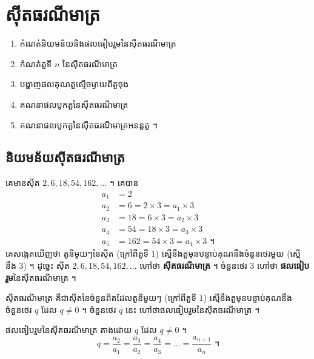 \chapter{ស៊ីតធរណីមាត្រ}

\begin{objBox}[វត្ថុបំណង]
\begin{enumerate}[1]
  \item កំណត់និយមន័យនិងផលធៀបរួមនៃស៊ីតធរណីមាត្រ
  \item កំណត់តួទី $n$ នៃស៊ីតធរណីមាត្រ
  \item បង្ហាញផលគុណតួស្មើចម្ងាយពីតួចុង
  \item គណនាផលបូកតួនៃស៊ីតធរណីមាត្រ
  \item គណនាផលបូកតួនៃស៊ីតធរណីមាត្រអនន្តតួ ។
\end{enumerate}
\end{objBox}

\section{និយមន័យស៊ីតធរណីមាត្រ}

\begin{example}[ឧទាហរណ៍]
គេមានស៊ីត $2, 6, 18, 54, 162, \ldots$ ។ គេបាន
\[
\begin{aligned}
a_1 &= 2\\
a_2 &= 6 = 2 \times 3 = a_1 \times 3\\
a_3 &= 18 = 6 \times 3 = a_2 \times 3\\
a_4 &= 54 = 18 \times 3 = a_3 \times 3\\
a_5 &= 162 = 54 \times 3 = a_4 \times 3 \text{ ។}
\end{aligned}
\]
គេសង្កេតឃើញថា តួនីមួយៗនៃស៊ីត (ក្រៅពីតួទី $1$) ស្មើនឹងតួមុនបន្ទាប់គុណនឹងចំនួនថេរមួយ (ស្មើនឹង $3$) ។ ដូច្នេះ ស៊ីត $2, 6, 18, 54, 162, \ldots$ ហៅថា \textbf{ស៊ីតធរណីមាត្រ} ។ ចំនួនថេរ $3$ ហៅថា \textbf{ផលធៀបរួម}នៃស៊ីតធរណីមាត្រ ។
\end{example}

\begin{definition}
ស៊ីតធរណីមាត្រ គឺជាស៊ីតនៃចំនួនពិតដែលតួនីមួយៗ (ក្រៅពីតួទី $1$) ស្មើនឹងតួមុនបន្ទាប់គុណនឹងចំនួនថេរ $q$ ដែល $q \ne 0$ ។ ចំនួនថេរ $q$ នេះ ហៅថាផលធៀបរួមនៃស៊ីតធរណីមាត្រ ។
\end{definition}

\begin{formulaBox}[ជាទូទៅ]
ផលធៀបរួមនៃស៊ីតធរណីមាត្រ តាងដោយ $q$ ដែល $q \ne 0$ ។
\[
q = \frac{a_2}{a_1} = \frac{a_3}{a_2} = \frac{a_4}{a_3} = \ldots = \frac{a_{n+1}}{a_n} \text{ ។}
\]
\end{formulaBox}

